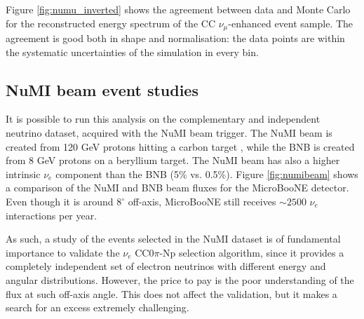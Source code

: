 Figure \ref{fig:numu_inverted} shows the agreement between data and Monte Carlo for the reconstructed energy spectrum of the CC $\nu_{\mu}$-enhanced event sample.
The agreement is good both in shape and normalisation: the data points are within the systematic uncertainties of the simulation in every bin.





\subsection{NuMI beam event studies}
It is possible to run this analysis on the complementary and independent neutrino dataset, acquired with the NuMI beam trigger. The NuMI beam is created from 120 GeV protons hitting a carbon target \cite{Adamson:2015dkw}, while the BNB is created from 8 GeV protons on a beryllium target. The NuMI beam has also a higher intrinsic $\nu_{e}$ component than the BNB (5\% vs. 0.5\%). Figure \ref{fig:numibeam} shows a comparison of the NuMI and BNB beam fluxes for the MicroBooNE detector. Even though it is around $8^{\circ}$ off-axis, MicroBooNE still receives $\sim2500$ $\nu_{e}$ interactions per year. 

As such, a study of the events selected in the NuMI dataset is of fundamental importance to validate the $\nu_{e}$ CC0$\pi$-Np selection algorithm, since it provides a completely independent set of electron neutrinos with different energy and angular distributions. 
However, the price to pay is the poor understanding of the flux at such off-axis angle. This does not affect the validation, but it makes a search for an excess extremely challenging. 

